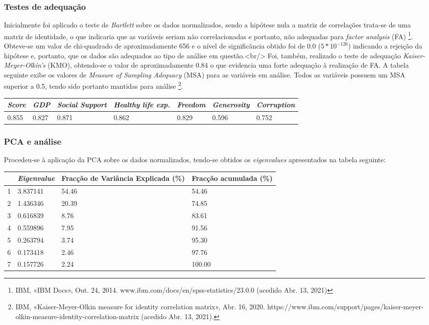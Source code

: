 \documentclass[]{article}
\begin{document}
\hypertarget{header-n157}{%
\subsubsection{Testes de adequação}\label{header-n157}}

Inicialmente foi aplicado o teste de \emph{Bartlett} sobre os dados
normalizados, sendo a hipótese nula a matriz de correlações trata-se de
uma matriz de identidade, o que indicaria que as variáveis seriam não
correlacionadas e portanto, não adequadas para \emph{factor analysis}
(FA) \footnote{IBM, «IBM Docs», Out. 24, 2014.
  www.ibm.com/docs/en/spss-statistics/23.0.0 (acedido Abr. 13, 2021)}.
Obteve-se um valor de chi-quadrado de aproximadamente 656 e o nível de
significância obtido foi de 0.0 (\(5*10^{-126}\)) indicando a rejeição
da hipótese e, portanto, que os dados são adequados ao tipo de análise
em questão.\textless{}br/\textgreater{} Foi, também, realizado o teste
de adequação \emph{Kaiser-Meyer-Olkin's} (KMO), obtendo-se o valor de
aproximadamente 0.84 o que evidencia uma forte adequação à realização de
FA. A tabela seguinte exibe os valores de \emph{Measure of Sampling
Adequacy} (MSA) para as variáveis em análise. Todos as variáveis possuem
um MSA superior a 0.5, tendo sido portanto mantidas para análise
\footnote{IBM, «Kaiser-Meyer-Olkin measure for identity correlation
  matrix», Abr. 16, 2020.
  https://www.ibm.com/support/pages/kaiser-meyer-olkin-measure-identity-correlation-matrix
  (acedido Abr. 13, 2021).}.

\begin{longtable}[]{@{}lllllll@{}}
\toprule
\emph{Score} & \emph{GDP} & \emph{Social Support} & \emph{Healthy life
exp.} & \emph{Freedom} & \emph{Generosity} &
\emph{Corruption}\tabularnewline
\midrule
\endhead
0.855 & 0.827 & 0.871 & 0.862 & 0.829 & 0.596 & 0.752\tabularnewline
\bottomrule
\end{longtable}

\hypertarget{header-n177}{%
\subsubsection{PCA e análise}\label{header-n177}}

Procedeu-se à aplicação da PCA sobre os dados normalizados, tendo-se
obtidos os \emph{eigenvalues} apresentados na tabela seguinte:

\begin{longtable}[]{@{}llll@{}}
\toprule
& \emph{Eigenvalue} & Fracção de Variância Explicada (\%) & Fracção
acumulada (\%)\tabularnewline
\midrule
\endhead
1 & 3.837141 & 54.46 & 54.46\tabularnewline
2 & 1.436346 & 20.39 & 74.85\tabularnewline
3 & 0.616839 & 8.76 & 83.61\tabularnewline
4 & 0.559896 & 7.95 & 91.56\tabularnewline
5 & 0.263794 & 3.74 & 95.30\tabularnewline
6 & 0.173418 & 2.46 & 97.76\tabularnewline
7 & 0.157726 & 2.24 & 100.00\tabularnewline
\bottomrule
\end{longtable}
\end{document}
